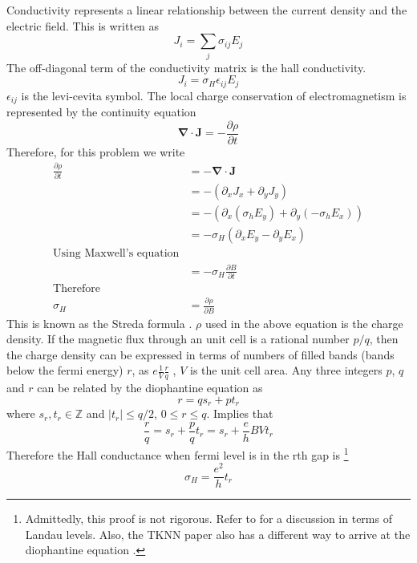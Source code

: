 Conductivity represents a linear relationship between the current density and the electric field. This is written as
\begin{equation}
 J_{i} = \sum_{j}\sigma_{ij}E_{j}
\end{equation} The off-diagonal term of the conductivity matrix is the hall conductivity.
\begin{equation}
 J_{i} = \sigma_{H}\epsilon_{ij}E_{j}
\end{equation} $\epsilon_{ij}$ is the levi-cevita symbol.
The local charge conservation of electromagnetism is represented by the continuity equation
\begin{equation}
 \mathbf{\nabla}\cdot\mathbf{J} = -\frac{\partial \rho}{\partial t}
\end{equation}
Therefore, for this problem we write
\begin{align}
 \frac{\partial \rho}{\partial t} &= -\mathbf{\nabla}\cdot\mathbf{J} \nonumber \\
 &= -(\partial_{x}J_{x} + \partial_{y}J_{y}) \nonumber \\
 &= -(\partial_{x}(\sigma_{h}E_{y}) + \partial_{y}(-\sigma_{h}E_{x})) \nonumber \\
 &= -\sigma_{H} (\partial_{x}E_{y} - \partial_{y}E_{x}) \nonumber  \\
 \text{Using Maxwell's equation}\\
 &= -\sigma_{H} \frac{\partial B}{\partial t} \nonumber \\
 \text{Therefore} \\
 \sigma_{H} &= \frac{\partial \rho}{\partial B}
\end{align}
This is known as the Streda formula \cite{streda1982quantised, bernevig2013topological}. $\rho$ used in the above equation is the charge density.
If the magnetic flux through an unit cell is a rational number $p/q$, then the charge density can be expressed in terms of
numbers of filled bands (bands below the fermi energy) $r$, as $e\frac{1}{V}\frac{r}{q}$ \cite{kohmoto1992flux,bernevig2013topological}, $V$ is the unit cell area.
Any three integers $p$, $q$ and $r$ can be related by the diophantine equation as
\begin{equation*}
 r = qs_{r} + pt_{r}
\end{equation*} where $s_{r},t_{r} \in \mathbb{Z}$ and $|t_{r}| \leq q/2$, $0\leq r \leq q$.
Implies that
\begin{equation*}
 \frac{r}{q} = s_{r} + \frac{p}{q}t_{r} = s_{r} + \frac{e}{h}BV t_{r}
\end{equation*} Therefore the Hall conductance when fermi level is in the rth gap is \footnote{Admittedly, this proof is not rigorous. Refer to \parencite{streda1982theory} for
a discussion in terms of Landau levels. Also, the TKNN paper also has a different way to arrive at the diophantine equation \cite{thouless1982quantized}.}
\begin{equation*}
 \sigma_{H} = \frac{e^2}{h}t_{r}
\end{equation*}


